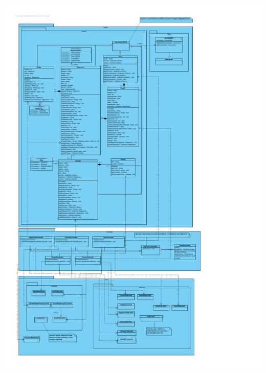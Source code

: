\documentclass[12pt,a4paper,titlepage,final]{report}
\begin{document}
		\begin{center}
			\captionsetup{type=figure}
			\includegraphics[height=20cm]{img/architektura-detail.pdf}
		\end{center}
\end{document}
